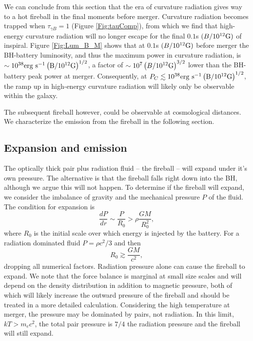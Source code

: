 We can conclude from this section that the era of curvature radiation
gives way to a hot fireball in the final moments before
merger. Curvature radiation becomes trapped when $\tau_{\gamma B}=1$
(Figure \ref{Fig:tauComp}), from which we find that high-energy
curvature radiation will no longer escape for the final $0.1$s
$(B/10^{12}\rm{G})$ of inspiral. Figure \ref{Fig:Lum_B_M} shows that at 
$0.1$s $(B/10^{12}\rm{G})$ before merger the BH-battery luminosity, 
and thus the maximum power in curvature radiation, is $\sim 10^{38} \rm{erg} \ \rm{s}^{-1}
\left(B/10^{12}\rm{G}\right)^{1/2}$, a factor of $\sim 10^7
\left(B/10^{12}\rm{G}\right)^{3/2}$ lower than the BH-battery peak
power at merger. Consequently, at $P_{C} \lesssim 10^{38} \rm{erg} \ \rm{s}^{-1}
\left(B/10^{12}\rm{G}\right)^{1/2}$, the ramp up in high-energy curvature radiation
will likely only be observable within the galaxy. 

The subsequent
fireball however, could be observable at cosmological distances. We
characterize the emission from the fireball in the following section.






\subsection{Expansion and emission}
The optically thick pair plus radiation fluid -- the fireball -- will
expand under it's own pressure. The alternative is that the fireball
falls right down into the BH, although we argue this will not happen.  To
determine if the fireball will expand, we consider the imbalance of
gravity and the mechanical pressure $P$ of the fluid. The condition
for expansion is
\begin{equation}
\frac{dP}{dr}\sim \frac{P}{R_0} > \rho \frac{GM}{R_0^2},
\label{Eq:PGbal}
\end{equation}
where $R_0$ is the initial scale over which energy is injected by the
battery. For a radiation dominated fluid $P=\rho c^2/3$ and then
\begin{equation}
R_0 \gtrsim  \frac{GM}{c^2},
\end{equation}
dropping all numerical factors. Radiation pressure alone can cause 
the fireball to expand. We note that the force balance is marginal at 
small size scales and will depend on the density distribution in addition 
to magnetic pressure, both of which will likely increase the outward 
pressure of the fireball and should be treated in a more detailed 
calculation. Considering the high temperature at merger, the pressure 
may be dominated by pairs, not radiation. In this limit, $kT > m_e c^2$, 
the total pair pressure is $7/4$ the radiation pressure and the fireball will still expand.


